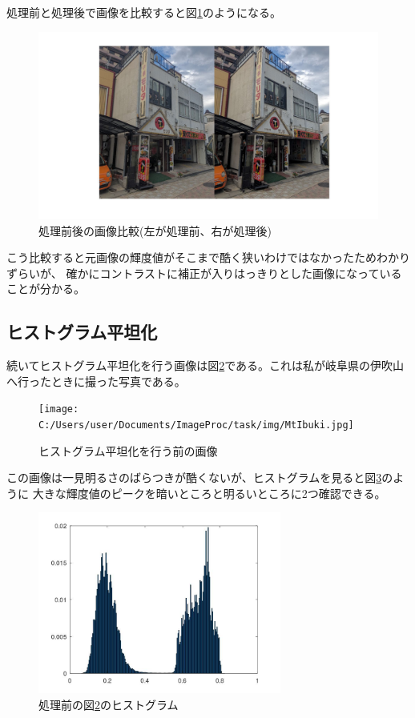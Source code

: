 \documentclass[a4paper,11pt,dvipdfmx]{jsarticle}
\begin{document}
処理前と処理後で画像を比較すると図\ref{conimg}のようになる。
\begin{figure}[htbp]
    \centering
    \includegraphics[width=120mm]{./img/linear_imgcon.jpg}
    \caption{処理前後の画像比較(左が処理前、右が処理後)}
    \label{conimg}
\end{figure}

こう比較すると元画像の輝度値がそこまで酷く狭いわけではなかったためわかりずらいが、
確かにコントラストに補正が入りはっきりとした画像になっていることが分かる。

\subsection{ヒストグラム平坦化}
続いてヒストグラム平坦化を行う画像は図\ref{MtIbuki}である。これは私が岐阜県の伊吹山へ行ったときに撮った写真である。
\begin{figure}[htbp]
    \centering
    \texttt{[image: C:/Users/user/Documents/ImageProc/task/img/MtIbuki.jpg]}
    \caption{ヒストグラム平坦化を行う前の画像}
    \label{MtIbuki}
\end{figure}

この画像は一見明るさのばらつきが酷くないが、ヒストグラムを見ると図\ref{bfhist_2}のように
大きな輝度値のピークを暗いところと明るいところに2つ確認できる。
\begin{figure}[htbp]
    \centering
    \includegraphics[width=80mm]{./img/flatten_beforefunc.jpg}
    \caption{処理前の図\ref{MtIbuki}のヒストグラム}
    \label{bfhist_2}
\end{figure}
\end{document}
